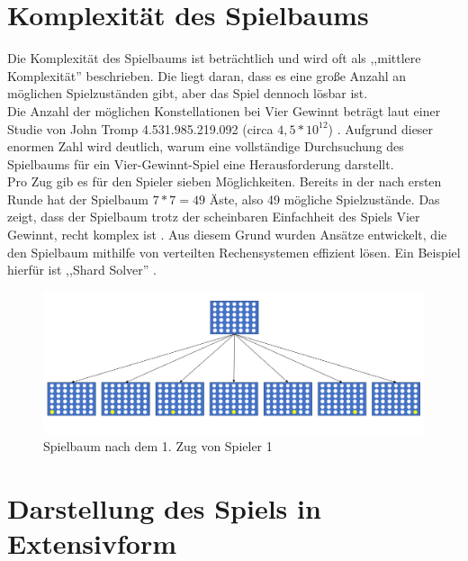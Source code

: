 \section{Komplexität des Spielbaums}
Die Komplexität des Spielbaums ist beträchtlich und wird oft als ,,mittlere Komplexität'' beschrieben. Die liegt daran, dass es eine große Anzahl an möglichen Spielzuständen gibt, aber das Spiel dennoch lösbar ist.\\
Die Anzahl der möglichen Konstellationen bei Vier Gewinnt beträgt laut einer Studie von John Tromp 4.531.985.219.092 (circa $4,5*10^{12}$) \autocite{thill2012reinforcement}. Aufgrund dieser enormen Zahl wird deutlich, warum eine vollständige Durchsuchung des Spielbaums für ein Vier-Gewinnt-Spiel eine Herausforderung darstellt.\\
Pro Zug gib es für den Spieler sieben Möglichkeiten. Bereits in der nach ersten Runde hat der Spielbaum $7*7 = 49$ Äste, also 49 mögliche Spielzustände. Das zeigt, dass der Spielbaum trotz der scheinbaren Einfachheit des Spiels Vier Gewinnt, recht komplex ist \autocite{thill2012reinforcement}\autocite{ruile2009viergewinnt}. Aus diesem Grund wurden Ansätze entwickelt, die den Spielbaum mithilfe von verteilten Rechensystemen effizient lösen. Ein Beispiel hierfür ist ,,Shard Solver'' \autocite{yokota2022exploration}.


\begin{figure}[H]
	\centering
	\includegraphics[width=0.9\linewidth]{"images/Baum1"}
	\caption[Spielbaum nach der 2. Tiefe]{Spielbaum nach dem 1. Zug von Spieler 1}
	\label{fig:baum1}
\end{figure}





 \section{Darstellung des Spiels in Extensivform}

